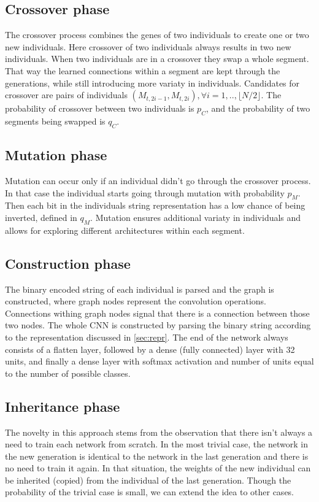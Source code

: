 \documentclass[eng]{simposium}
\begin{document}
\subsection{Crossover phase}
The crossover process combines the genes of two individuals to create one or two new individuals.
Here crossover of two individuals always results in two new individuals.
When two individuals are in a crossover they swap a whole segment.
That way the learned connections within a segment are kept through the generations, while still introducing more variaty in individuals.
Candidates for crossover are pairs of individuals $(M_{t,2i-1}, M_{t,2i}), \forall i=1,..,\lfloor N/2\rfloor $.
The probability of crossover between two individuals is $p_C$, and the probability of two segments being swapped is $q_C$.

\subsection{Mutation phase}
Mutation can occur only if an individual didn't go through the crossover process.
In that case the individual starts going through mutation with probability $p_M$.
Then each bit in the individuals string representation has a low chance of being inverted, defined in $q_M$.
Mutation ensures additional variaty in individuals and allows for exploring different architectures within each segment.

\subsection{Construction phase}
The binary encoded  string of each individual is parsed and the graph is constructed, where graph nodes represent the convolution operations.
Connections withing graph nodes signal that there is a connection between those two nodes.
The whole CNN is constructed by parsing the binary string according to the representation discussed in \ref{sec:repr}. 
The end of the network always consists of a flatten layer, followed by a dense (fully connected) layer with 32 units, and finally a dense 
layer with softmax activation and number of units equal to the number of possible classes.

\subsection{Inheritance phase}
The novelty in this approach stems from the observation that there isn't always a need to train each network from scratch.
In the most trivial case, the network in the new generation is identical to the network in the last generation and there is no need to train it again.
In that situation, the weights of the new individual can be inherited (copied) from the individual of the last generation.
Though the probability of the trivial case is small, we can extend the idea to other cases.
\end{document}

